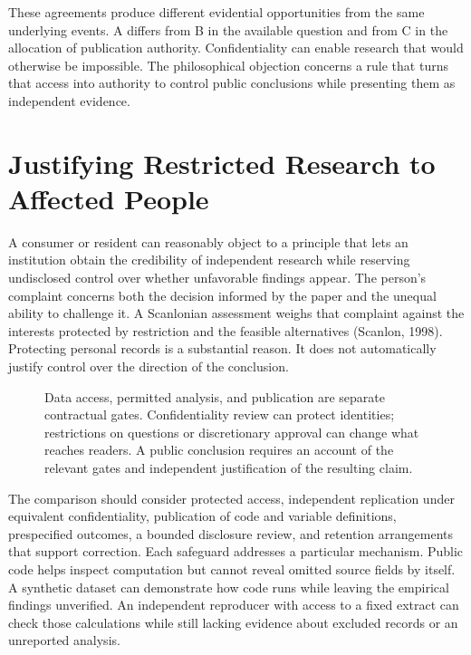 These agreements produce different evidential opportunities from the
same underlying events. A differs from B in the available question and
from C in the allocation of publication authority. Confidentiality can
enable research that would otherwise be impossible. The philosophical
objection concerns a rule that turns that access into authority to
control public conclusions while presenting them as independent
evidence.


\hypertarget{M09-justifying-restricted-research-to-affected-people}{%
\section{Justifying Restricted Research to Affected
People}\label{M09-justifying-restricted-research-to-affected-people}}

\noindent A consumer or resident can reasonably object to a principle that lets an
institution obtain the credibility of independent research while
reserving undisclosed control over whether unfavorable findings appear.
The person's complaint concerns both the decision informed by the paper
and the unequal ability to challenge it. A Scanlonian assessment weighs
that complaint against the interests protected by restriction and the
feasible alternatives (Scanlon, 1998). Protecting personal records is a
substantial reason. It does not automatically justify control over the
direction of the conclusion.

\begin{figure}[htbp]
\centering

\caption{Data access, permitted analysis, and publication are separate contractual gates. Confidentiality review can protect identities; restrictions on questions or discretionary approval can change what reaches readers. A public conclusion requires an account of the relevant gates and independent justification of the resulting claim.}\label{fig:M09_restricted_research}
\end{figure}

The comparison should consider protected access, independent replication
under equivalent confidentiality, publication of code and variable
definitions, prespecified outcomes, a bounded disclosure review, and
retention arrangements that support correction. Each safeguard addresses
a particular mechanism. Public code helps inspect computation but cannot
reveal omitted source fields by itself. A synthetic dataset can
demonstrate how code runs while leaving the empirical findings
unverified. An independent reproducer with access to a fixed extract can
check those calculations while still lacking evidence about excluded
records or an unreported analysis.

